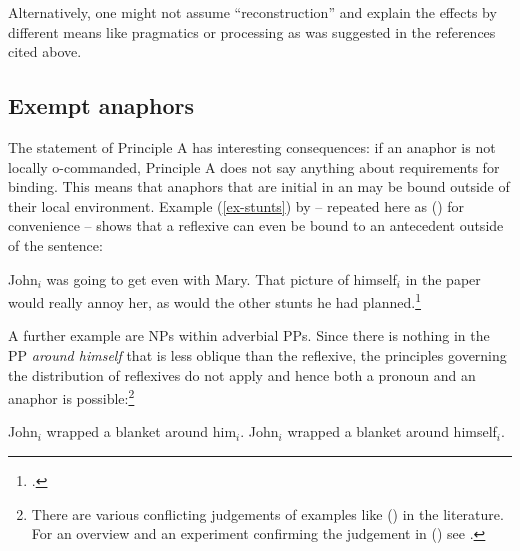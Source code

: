 \documentclass[output=paper,biblatex,babelshorthands,newtxmath,draftmode,colorlinks,citecolor=brown]{langscibook}
\begin{document}
{Alternatively, one might not assume ``reconstruction'' and explain the effects by different means
like pragmatics or processing as was suggested in the references cited above.
}

\subsection{Exempt anaphors}
\label{sec-excempt-anaphors}\label{binding:sec-excempt-anaphors}


The statement of Principle A has interesting consequences: if an anaphor is not locally o-commanded,
Principle A does not say anything about requirements for binding. This means that anaphors that are
initial in an \argstl may be bound outside of their local environment. Example (\ref{ex-stunts}) by
\citet[]{ps2} -- repeated here as () for convenience -- shows that a reflexive can even be bound to an antecedent outside of the sentence:

\eanoraggedright
John$_i$ was going to get even with Mary. That picture of himself$_i$
in the paper would really annoy her, as would the other stunts he had planned.\footnote{
        .
}
\z

\noindent
A further example are NPs within adverbial PPs. Since there is nothing in the PP \emph{around
  himself} that is less oblique than the reflexive, the principles governing the distribution of
reflexives do not apply and hence both a pronoun and an anaphor is possible:\footnote{
  There are various conflicting judgements of examples like () in the literature. For an
  overview and an experiment confirming the judgement in () see .
}

\eal
\label{ex-john-wrapped-a-blanket-around-him}
\ex John$_i$ wrapped a blanket around him$_i$.
\ex John$_i$ wrapped a blanket around himself$_i$.
\zl
{}
\end{document}
